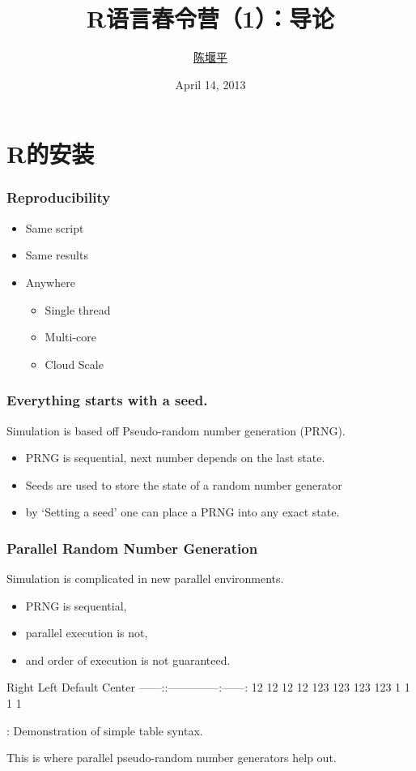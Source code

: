 \documentclass[ignorenonframetext,]{beamer}
\title{R语言春令营（1）：导论}
\author{\href{mailto:chen@yanping.me}{陈堰平}}
\date{April 14, 2013}
\institute[统计之都]{
统计之都\\
\hurl{http://cos.name}
}
\begin{document}
  \frame{\titlepage}
 
\section{R的安装}

\begin{frame}\frametitle{Reproducibility}

\begin{itemize}
\item
  Same script
\item
  Same results
\item
  Anywhere
  \begin{itemize}
  \item
    Single thread
  \item
    Multi-core
  \item
    Cloud Scale
  \end{itemize}
\end{itemize}
\end{frame}

\begin{frame}\frametitle{Everything starts with a seed.}

Simulation is based off Pseudo-random number generation (PRNG).

\begin{itemize}
\item
  PRNG is sequential, next number depends on the last state.
\item
  Seeds are used to store the state of a random number generator
\item
  by `Setting a seed' one can place a PRNG into any exact state.
\end{itemize}
\end{frame}

\begin{frame}\frametitle{Parallel Random Number Generation}

Simulation is complicated in new parallel environments.

\begin{itemize}
\item
  PRNG is sequential,
\item
  parallel execution is not,
\item
  and order of execution is not guaranteed.
\end{itemize}
\textbar{} Right \textbar{} Left \textbar{} Default \textbar{} Center
\textbar{}
\textbar{}------:\textbar{}:-----\textbar{}---------\textbar{}:------:\textbar{}
\textbar{} 12 \textbar{} 12 \textbar{} 12 \textbar{} 12 \textbar{}
\textbar{} 123 \textbar{} 123 \textbar{} 123 \textbar{} 123 \textbar{}
\textbar{} 1 \textbar{} 1 \textbar{} 1 \textbar{} 1 \textbar{}

: Demonstration of simple table syntax.

This is where parallel pseudo-random number generators help out.

\end{frame}
\end{document}
